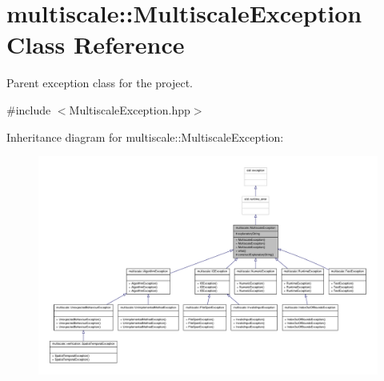 \hypertarget{classmultiscale_1_1MultiscaleException}{\section{multiscale\-:\-:\-Multiscale\-Exception \-Class \-Reference}
\label{classmultiscale_1_1MultiscaleException}
}


\-Parent exception class for the project.  




{\ttfamily \#include $<$\-Multiscale\-Exception.\-hpp$>$}



\-Inheritance diagram for multiscale\-:\-:\-Multiscale\-Exception\-:
\nopagebreak
\begin{figure}[H]
\begin{center}
\leavevmode
\includegraphics[width=350pt]{classmultiscale_1_1MultiscaleException__inherit__graph}
\end{center}
\end{figure}


